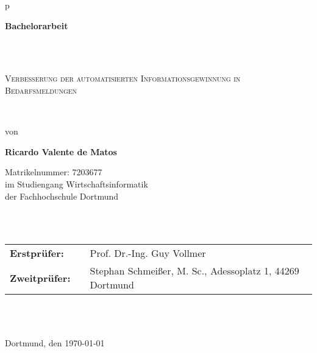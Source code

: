 \begin{center}
	\begin{tabular}{p{\textwidth}}
		
		\begin{center}
			\textbf{\Large{Bachelorarbeit}}
		\end{center} \\ \\
		
		\begin{center}
			\LARGE{\textsc{
					Verbesserung der automatisierten Informationsgewinnung in Bedarfsmeldungen
			}}
		\end{center}
		
		\\
		
		
		
		\begin{center}
			von
		\end{center}
		
		\begin{center}
			\large{\textbf{Ricardo Valente de Matos}}
		\end{center}
	
	\begin{center}
		\large{Matrikelnummer: 7203677} \\
		\large{im Studiengang Wirtschaftsinformatik \\
			der Fachhochschule Dortmund \\}
	\end{center}
		
		
		\\
		
		\\
		
		\begin{center}
			\begin{tabular}{lll}
				\textbf{Erstprüfer:} & & Prof. Dr.-Ing. Guy Vollmer\\
				\textbf{Zweitprüfer:} & & Stephan Schmeißer, M. Sc., Adessoplatz 1, 44269 Dortmund\\
			\end{tabular}
		\end{center}
	
	\\ \\
	
	\begin{center}
		\large{Dortmund, den \today}
	\end{center}
		
	\end{tabular}
\end{center}
